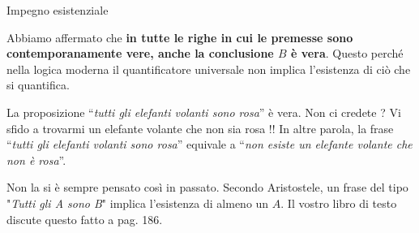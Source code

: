 \documentclass[aspectratio=169,10pt,dvipsnames,xcolor=table]{beamer}
\begin{document}
\begin{frame}{Impegno esistenziale}
    \medskip

    \medskip
    Abbiamo affermato che \textbf{in tutte le righe in cui le premesse sono contemporanamente vere, anche la conclusione $B$ è vera}. Questo perché nella logica moderna il quantificatore universale non implica l'esistenza di ciò che si quantifica.

    \medskip
    La proposizione ``\emph{tutti gli elefanti volanti sono rosa}'' è vera. Non ci credete ? Vi sfido a trovarmi un elefante volante che non sia rosa !! In altre parola, la frase ``\emph{tutti gli elefanti volanti sono rosa}'' equivale a ``\emph{non esiste un elefante volante che non è rosa}''.


    \medskip
    Non la si è sempre pensato così in passato. Secondo Aristostele, un frase del tipo "\emph{Tutti gli A sono B}" implica l'esistenza di almeno un $A$. Il vostro libro di testo discute questo fatto a pag. 186.
\end{frame}
\end{document}
